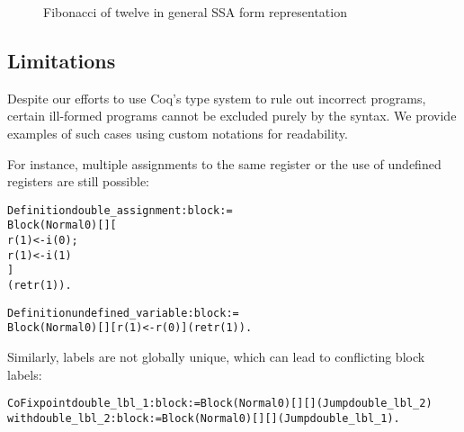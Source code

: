 \begin{figure}[ht]
    \centering
    \caption{Fibonacci of twelve in general SSA form representation}
    \label{fig:example-jair}
\end{figure}

\subsection{Limitations}
\label{subsec:limitations}

Despite our efforts to use Coq's type system to rule out incorrect programs, certain ill-formed programs cannot be excluded purely by the syntax. We provide examples of such cases using custom notations for readability.

For instance, multiple assignments to the same register or the use of undefined registers are still possible:

\begin{alltt}
Definition double_assignment : block :=
  Block (Normal 0) [] [
    r(1) <- i(0);
    r(1) <- i(1)
  ]
  (ret r(1)).

Definition undefined_variable : block :=
  Block (Normal 0) [] [r(1) <- r(0)] (ret r(1)).
\end{alltt}

Similarly, labels are not globally unique, which can lead to conflicting block labels:

\begin{alltt}
CoFixpoint double_lbl_1 : block := Block (Normal 0) [] [] (Jump double_lbl_2)
  with double_lbl_2 : block := Block (Normal 0) [] [] (Jump double_lbl_1).
\end{alltt}

